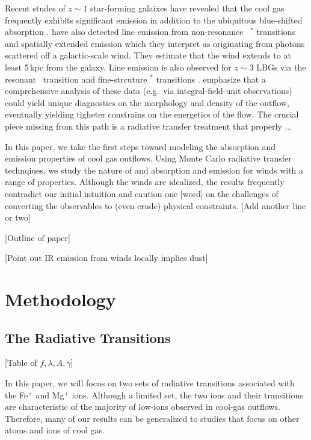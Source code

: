 \documentclass[12pt,preprint]{aastex}
\begin{document}
Recent studes of $z \sim 1$ star-forming galaixes have revealed that
the cool gas frequently exhibits significant  emission in
addition to the ubiquitous blue-shifted absorption
\citep{wcp+09,rubin+10b}.  \cite{rubin+10a} have also detected line
emission from non-resonance ~$^*$ transitions and spatially
extended  emission which they interpret as originating from
photons scattered off a galactic-scale wind.  They estimate that the
wind extends to at least 5\,kpc from the galaxy.  Line emission is
also observed for $z \sim 3$ LBGs via the resonant \lya\ transition
and fine-strcuture $^*$ transitions \citep{cb58,shapley}.
\cite{rubin+10a} emphasize that a comprehensive analysis of these data
(e.g.\ via integral-field-unit observations) could yield unique
diagnostics on the morphology and density of the outflow, eventually
yielding tigheter constrains on the energetics of the flow.  
The crucial piece missing from this path is a radiative transfer
treatment that properly ...

In this paper, we take the first steps toward modeling the absorption
and emission properties of cool gas outflows.  Using Monte Carlo
radiative transfer technqiues, we study the nature of  and
 absorption and emission for winds with a range of
properties.  Although the winds are idealized, the results frequently
contradict our initial intuition and caution one [word] on the
challenges of converting the observables to (even crude) physical
constraints.  [Add another line or two]

[Outline of paper]


[Point out IR emission from winds locally implies dust]

\section{Methodology}
\label{sec:method}

\subsection{The Radiative Transitions}

[Table of $f,\lambda,A,\gamma$]

In this paper, we will focus on two sets of radiative transitions
associated with the Fe$^+$ and Mg$^+$ ions.
Although a limited
set, the two ions and their transitions are characteristic
of the majority of low-ions 
observed in cool-gas outflows. Therefore, many
of our results can be generalized to studies that focus on other atoms
and ions of cool gas.
\end{document}
